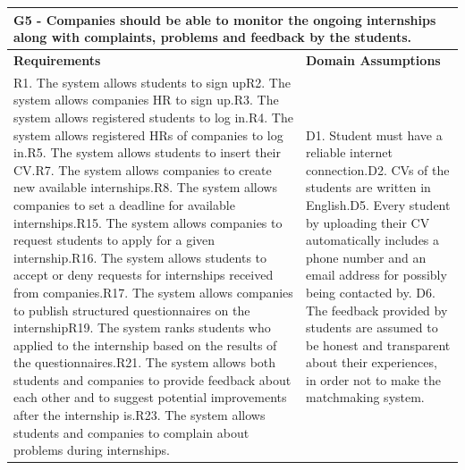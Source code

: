 \documentclass{article}
\begin{document}
\begin{table}[H]
    \centering
    \begin{tabular}{|p{}|p{}|}
        \hline
        \multicolumn{2}{|p{10cm}|}{\textbf{G5} - Companies should be able to monitor the ongoing internships along with complaints, problems and feedback by the students.} \\
        \hline
        \textbf{Requirements} & \textbf{Domain Assumptions} \\
        \hline
        R1. The system allows students to sign up\newline R2. The system allows companies HR to sign up.\newline R3. The system allows registered students to log in.\newline R4. The system allows registered HRs of companies to log in.\newline R5. The system allows students to insert their CV.\newline R7. The system allows companies to create new available internships.\newline R8. The system allows companies to set a deadline for available internships.\newline  R15. The system allows companies to request students to apply for a given
internship.\newline R16. The system allows students to accept or deny requests for internships
received from companies.\newline R17. The system allows companies to publish structured questionnaires on
the internship\newline R19. The system ranks students who applied to the internship based on the
results of the questionnaires.\newline R21. The system allows both students and companies to provide feedback about each other and to suggest potential improvements after the internship is.\newline R23. The system allows students and companies to complain about problems
during internships.\newline  & D1. Student must have a reliable internet connection.\newline D2. CVs of the students are written in English.\newline D5. Every student by uploading their CV automatically includes a phone number and an email address for possibly being contacted by. \newline D6. The feedback provided by students are assumed to be honest and transparent about their experiences, in order not to make the matchmaking system. \newline
\\
        \hline
    \end{tabular}
\end{table}
\end{document}
